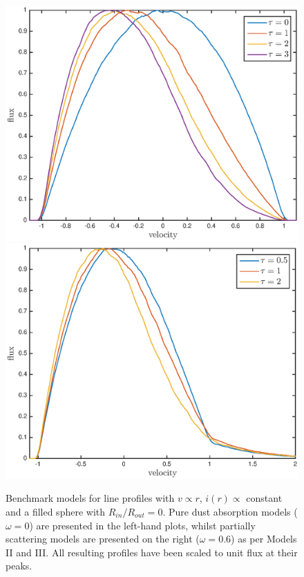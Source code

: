 \documentclass[useAMS,usenatbib,usegraphicx]{mnras}
\begin{document}
\begin{figure}
\includegraphics[trim =37 10 45 15,clip=true,scale=0.51]{params/opt_thick_w0} 
\includegraphics[trim =37 10 45 15,clip=true,scale=0.51]{params/opt_thick_w0_6}  
\caption{Benchmark models for line profiles  with $v \propto r$, $i(r) \propto$ constant and a filled sphere with $R_{in}/R_{out}=0$.  Pure dust absorption models ($\omega = 0$) are presented in the left-hand plots, whilst partially scattering models are presented on the right ($\omega = 0.6$) as per \citet{Lucy1989} Models II and III. All resulting profiles have been scaled to unit flux at their peaks.}
\label{fig:Lucy}
\end{figure}
\end{document}
